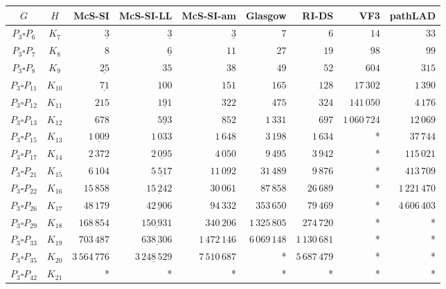 
\begin{tabular}{ccrrrrrrr}
    \toprule
    {$G$} & {$H$} & {McS-SI} & {McS-SI-LL} & {McS-SI-am} & Glasgow & RI-DS & VF3 & pathLAD \\ 
    \midrule

$P_3\square P_{6}$ & $K_{7}$ & $\underline{3}$ & $\underline{3}$ & $\underline{3}$ & $7$ & $6$ & $14$ & $33$\\
$P_3\square P_{7}$ & $K_{8}$ & $8$ & $\underline{6}$ & $11$ & $27$ & $19$ & $98$ & $99$\\
$P_3\square P_{8}$ & $K_{9}$ & $\underline{25}$ & $35$ & $38$ & $49$ & $52$ & $604$ & $315$\\
$P_3\square P_{11}$ & $K_{10}$ & $\underline{71}$ & $100$ & $151$ & $165$ & $128$ & $17\,302$ & $1\,390$\\
$P_3\square P_{12}$ & $K_{11}$ & $215$ & $\underline{191}$ & $322$ & $475$ & $324$ & $141\,050$ & $4\,176$\\
$P_3\square P_{13}$ & $K_{12}$ & $678$ & $\underline{593}$ & $852$ & $1\,331$ & $697$ & $1\,060\,724$ & $12\,069$\\
$P_3\square P_{15}$ & $K_{13}$ & $\underline{1\,009}$ & $1\,033$ & $1\,648$ & $3\,198$ & $1\,634$ & * & $37\,744$\\
$P_3\square P_{17}$ & $K_{14}$ & $2\,372$ & $\underline{2\,095}$ & $4\,050$ & $9\,495$ & $3\,942$ & * & $115\,021$\\
$P_3\square P_{21}$ & $K_{15}$ & $6\,104$ & $\underline{5\,517}$ & $11\,092$ & $31\,489$ & $9\,876$ & * & $413\,709$\\
$P_3\square P_{22}$ & $K_{16}$ & $15\,858$ & $\underline{15\,242}$ & $30\,061$ & $87\,858$ & $26\,689$ & * & $1\,221\,470$\\
$P_3\square P_{26}$ & $K_{17}$ & $48\,179$ & $\underline{42\,906}$ & $94\,332$ & $353\,650$ & $79\,469$ & * & $4\,606\,403$\\
$P_3\square P_{29}$ & $K_{18}$ & $168\,854$ & $\underline{150\,931}$ & $340\,206$ & $1\,325\,805$ & $274\,720$ & * & *\\
$P_3\square P_{33}$ & $K_{19}$ & $703\,487$ & $\underline{638\,306}$ & $1\,472\,146$ & $6\,069\,148$ & $1\,130\,681$ & * & *\\
$P_3\square P_{35}$ & $K_{20}$ & $3\,564\,776$ & $\underline{3\,248\,529}$ & $7\,510\,687$ & * & $5\,687\,479$ & * & *\\
$P_3\square P_{42}$ & $K_{21}$ & * & * & * & * & * & * & *\\

    \bottomrule
\end{tabular}

